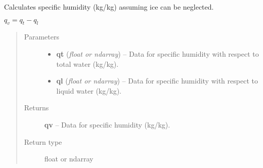 \documentclass[letterpaper,10pt,english]{sphinxmanual}
\begin{document}
\begin{fulllineitems}
\label{atmos:atmos.equations.qv_from_qt_ql}
Calculates specific humidity (kg/kg) assuming ice can be neglected.

\(q_v = q_t-q_l\)
\begin{quote}\begin{description}
\item[{Parameters}] \leavevmode\begin{itemize}
\item {} 
\textbf{qt} (\emph{float or ndarray}) -- Data for specific humidity with respect to total water (kg/kg).

\item {} 
\textbf{ql} (\emph{float or ndarray}) -- Data for specific humidity with respect to liquid water (kg/kg).

\end{itemize}

\item[{Returns}] \leavevmode
\textbf{qv} --
Data for specific humidity (kg/kg).

\item[{Return type}] \leavevmode
float or ndarray

\end{description}\end{quote}

\end{fulllineitems}

\end{document}
